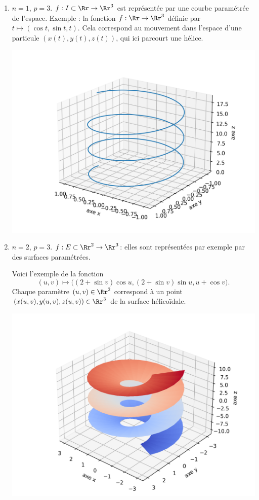 \documentclass[11pt, class=report,crop=false]{standalone}
\begin{document}
\begin{exemple}
\begin{enumerate}
\item $n=1$, $p=3$. $f: I \subset \Rr \rightarrow \Rr^3$ 
est représentée par une courbe paramétrée de l'espace.
Exemple : la fonction $f : \Rr \to \Rr^3$ définie par $t \mapsto (\cos t,\sin t, t)$.
Cela correspond au mouvement dans l'espace d'une particule $(x(t),y(t),z(t))$, qui ici parcourt une hélice.
\begin{center}
    \includegraphics[scale=\myscale,scale=0.5]{figures/fonctions-intro-04}
\end{center}


       
\item $n=2$, $p=3$. $f: E \subset \Rr^2 \rightarrow \Rr^3$: elles sont représentées par exemple par des surfaces paramétrées.

Voici l'exemple de la fonction 
$$(u,v) \mapsto \big( (2+\sin v)\cos u, (2+\sin v)\sin u,u+\cos v \big).$$
Chaque paramètre $(u,v) \in \Rr^2$ correspond à un point $(x(u,v),y(u,v),z(u,v)) \in \Rr^3$ de la surface hélicoïdale.

\begin{center}
    \includegraphics[scale=\myscale,scale=0.6]{figures/fonctions-intro-05}
\end{center}


\end{enumerate}
\end{exemple}
\end{document}
